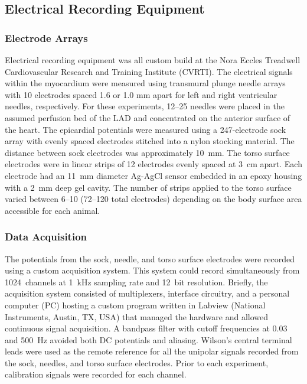 \documentclass[twocolumn]{cinc}
\begin{document}
\subsection{Electrical Recording Equipment}

\subsubsection{Electrode Arrays}

Electrical recording equipment was all custom build at the Nora Eccles
Treadwell Cardiovascular Research and Training Institute (CVRTI). The
electrical signals within the myocardium were measured using transmural
plunge needle arrays with 10 electrodes spaced 1.6 or 1.0 mm apart for left
and right ventricular needles, respectively. For these experiments,
12--25 needles were placed in the assumed perfusion bed of the LAD and concentrated on the anterior surface of the heart. The
epicardial potentials were measured using a 247-electrode sock array with
evenly spaced electrodes stitched into a nylon stocking material. The
distance between sock electrodes was approximately 10~mm. The torso surface
electrodes were in linear strips of 12 electrodes evenly spaced at 3~cm
apart. Each electrode had an 11~mm diameter Ag-AgCl sensor embedded in
an epoxy housing with a 2~mm deep gel cavity. The number of strips applied
to the torso surface varied between 6--10 
(72--120 total electrodes) depending on the body surface area
accessible for each animal.

\subsubsection{Data Acquisition}

The potentials from the sock, needle, and torso surface electrodes were
recorded using a custom acquisition system. This system could record
simultaneously from 1024~channels at 1~kHz sampling rate and 12~bit
resolution. Briefly, the acquisition system consisted of multiplexers,
interface circuitry, and a personal computer (PC) hosting a custom program
written in Labview (National Instruments, Austin, TX, USA) that managed the
hardware and allowed continuous signal acquisition. A bandpass filter with
cutoff frequencies at 0.03 and 500~Hz avoided both DC potentials and
aliasing.  Wilson's central terminal leads were used as the remote
reference for all the unipolar signals recorded from the sock, needles,
and torso surface electrodes. Prior to each experiment, calibration signals
were recorded for each channel.
\end{document}
